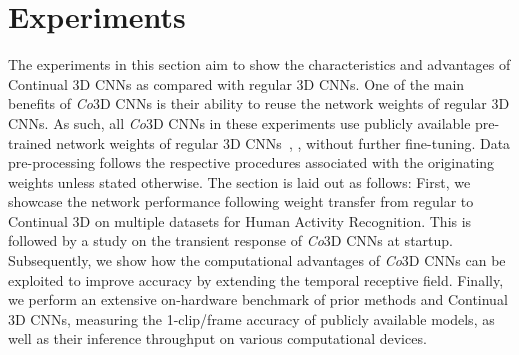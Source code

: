 \vspace{-2mm}
\section{Experiments} 
\vspace{-2mm}
The experiments in this section aim to show the characteristics and advantages of Continual 3D CNNs as compared with regular 3D CNNs.
One of the main benefits of \textit{Co}3D CNNs is their ability to reuse the network weights of regular 3D CNNs. 
As such, all \textit{Co}3D CNNs in these experiments use publicly available pre-trained network weights of regular 3D CNNs~\cite{feichtenhofer2019slowfast}, \cite{feichtenhofer2020x3d}, \cite{fan2021pytorchvideo} without further fine-tuning.
Data pre-processing follows the respective procedures associated with the originating weights unless stated otherwise.
% 
The section is laid out as follows: 
First, we showcase the network performance following weight transfer from regular to Continual 3D on multiple datasets for Human Activity Recognition. %
This is followed by a study on the transient response of \textit{Co}3D CNNs at startup.
Subsequently, we show how the computational advantages of \textit{Co}3D CNNs can be exploited to improve accuracy by extending the temporal receptive field.
Finally, we perform an extensive on-hardware benchmark of prior methods and Continual 3D CNNs, measuring the 1-clip/frame accuracy of publicly available models, as well as their inference throughput on various computational devices.



